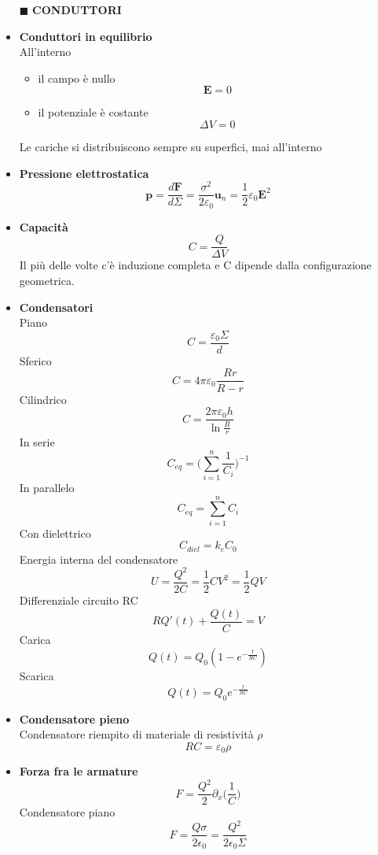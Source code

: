 \documentclass{book}
\newcommand{\g}{\textbf}
\newcommand{\h}{\mathbf}
\newcommand{\e}{\begin{equation}}
\newcommand{\ex}{\end{equation} }
\renewcommand{\it}{\item[$\cdot$]}
\begin{document}
\begin{multicols}{4}
\begin{itemize}
\hline
\item [$\blacksquare$] \g{CONDUTTORI}
    \it \g{Conduttori in equilibrio} \\
    All’interno
    \begin{itemize}
        \item il campo è nullo \e{\h{E}=0} \ex
        \item il potenziale è costante \e{\Delta V=0} \ex
    \end{itemize}
    Le cariche si distribuiscono sempre su superfici, mai all’interno
    \it \g{Pressione elettrostatica}
        \e{\h{p}=\frac{d\h{F}}{d\Sigma}=\frac{\sigma^2}{2\varepsilon_0}\h{u}_n=\frac{1}{2}\varepsilon_0 \h{E}^2} \ex
    \it \g{Capacità}
        \e{C=\frac{Q}{\Delta V}} \ex
        Il più delle volte c'è induzione completa e C dipende dalla configurazione geometrica.
    \it \g{Condensatori} \\
    Piano
        \e{C=\frac{\varepsilon_0 \Sigma}{d}} \ex
    Sferico
        \e{C=4\pi\varepsilon_0\frac{Rr}{R-r}} \ex
    Cilindrico
        \e{C=\frac{2\pi\varepsilon_0 h}{\ln \frac{R}{r}}} \ex
    In serie 
        \e{C_{eq}=\biggl( \sum_{i=1}^n \frac{1}{C_i} \biggr)^{-1}} \ex
    In parallelo
        \e{C_{eq}= \sum_{i=1}^n C_i} \ex
    Con dielettrico
        \e{C_{diel}=k_e C_0} \ex
    Energia interna del condensatore
        \e{U=\frac{Q^2}{2C}=\frac{1}{2}CV^2=\frac{1}{2}QV} \ex
    Differenziale circuito RC
        \e{RQ'(t)+\frac{Q(t)}{C}=V} \ex
    Carica
        \e{Q(t)=Q_0(1-e^{-\frac{t}{RC}})} \ex
    Scarica
        \e{Q(t)=Q_0 e^{-\frac{t}{RC}}} \ex
    \it \g{Condensatore pieno} \\
        Condensatore riempito di materiale di resistività $\rho$
        \e{RC=\varepsilon_0\rho} \ex
    \it \g{Forza fra le armature}
        \e{F=\frac{Q^2}{2}\partial_x \biggl(\frac{1}{C}\biggr)}\ex
        Condensatore piano
        \e{F=\frac{Q\sigma}{2\epsilon_0}=\frac{Q^2}{2\epsilon_0\Sigma}} \ex


\end{itemize}
\end{multicols}
\end{document}
